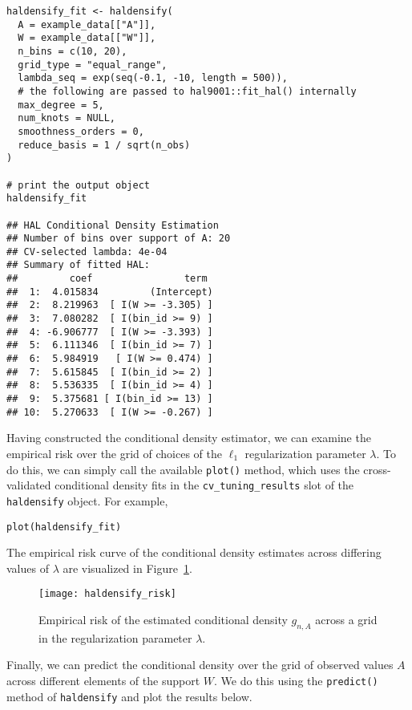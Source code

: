 \begin{lstlisting}
haldensify_fit <- haldensify(
  A = example_data[["A"]],
  W = example_data[["W"]],
  n_bins = c(10, 20),
  grid_type = "equal_range",
  lambda_seq = exp(seq(-0.1, -10, length = 500)),
  # the following are passed to hal9001::fit_hal() internally
  max_degree = 5,
  num_knots = NULL,
  smoothness_orders = 0,
  reduce_basis = 1 / sqrt(n_obs)
)

# print the output object
haldensify_fit

## HAL Conditional Density Estimation
## Number of bins over support of A: 20
## CV-selected lambda: 4e-04
## Summary of fitted HAL:
##         coef                term
##  1:  4.015834         (Intercept)
##  2:  8.219963  [ I(W >= -3.305) ]
##  3:  7.080282  [ I(bin_id >= 9) ]
##  4: -6.906777  [ I(W >= -3.393) ]
##  5:  6.111346  [ I(bin_id >= 7) ]
##  6:  5.984919   [ I(W >= 0.474) ]
##  7:  5.615845  [ I(bin_id >= 2) ]
##  8:  5.536335  [ I(bin_id >= 4) ]
##  9:  5.375681 [ I(bin_id >= 13) ]
## 10:  5.270633  [ I(W >= -0.267) ]
\end{lstlisting}

Having constructed the conditional density estimator, we can examine the
empirical risk over the grid of choices of the $\ell_1$ regularization parameter
$\lambda$. To do this, we can simply call the available \texttt{plot()} method,
which uses the cross-validated conditional density fits in the
\texttt{cv\_tuning\_results} slot of the \texttt{haldensify} object. For example,

\begin{lstlisting}
plot(haldensify_fit)
\end{lstlisting}

The empirical risk curve of the conditional density estimates across differing
values of $\lambda$ are visualized in Figure~\ref{fig:haldensify_risk}.
\begin{figure}[H]
  \centering
  \texttt{[image: haldensify\_risk]}
  \caption{Empirical risk of the estimated conditional density $g_{n,A}$ across
      a grid in the regularization parameter $\lambda$.}
  \label{fig:haldensify_risk}
\end{figure}

Finally, we can predict the conditional density over the grid of observed values
$A$ across different elements of the support $W$. We do this using the
\texttt{predict()} method of \texttt{haldensify} and plot the results below.

